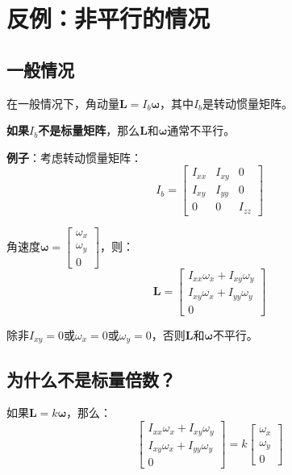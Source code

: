 \documentclass[12pt,a4paper]{article}
\begin{document}
\section{反例：非平行的情况}

\subsection{一般情况}

在一般情况下，角动量$\bm{L} = I_b \bm{\omega}$，其中$I_b$是转动惯量矩阵。

\textbf{如果$I_b$不是标量矩阵}，那么$\bm{L}$和$\bm{\omega}$通常不平行。

\textbf{例子}：考虑转动惯量矩阵：
\begin{equation}
I_b = \begin{bmatrix}
I_{xx} & I_{xy} & 0 \\
I_{xy} & I_{yy} & 0 \\
0 & 0 & I_{zz}
\end{bmatrix}
\end{equation}

角速度$\bm{\omega} = \begin{bmatrix} \omega_x \\ \omega_y \\ 0 \end{bmatrix}$，则：
\begin{equation}
\bm{L} = \begin{bmatrix}
I_{xx} \omega_x + I_{xy} \omega_y \\
I_{xy} \omega_x + I_{yy} \omega_y \\
0
\end{bmatrix}
\end{equation}

除非$I_{xy} = 0$或$\omega_x = 0$或$\omega_y = 0$，否则$\bm{L}$和$\bm{\omega}$不平行。

\subsection{为什么不是标量倍数？}

如果$\bm{L} = k \bm{\omega}$，那么：
\begin{equation}
\begin{bmatrix}
I_{xx} \omega_x + I_{xy} \omega_y \\
I_{xy} \omega_x + I_{yy} \omega_y \\
0
\end{bmatrix} = k \begin{bmatrix}
\omega_x \\ \omega_y \\ 0
\end{bmatrix}
\end{equation}
\end{document}
